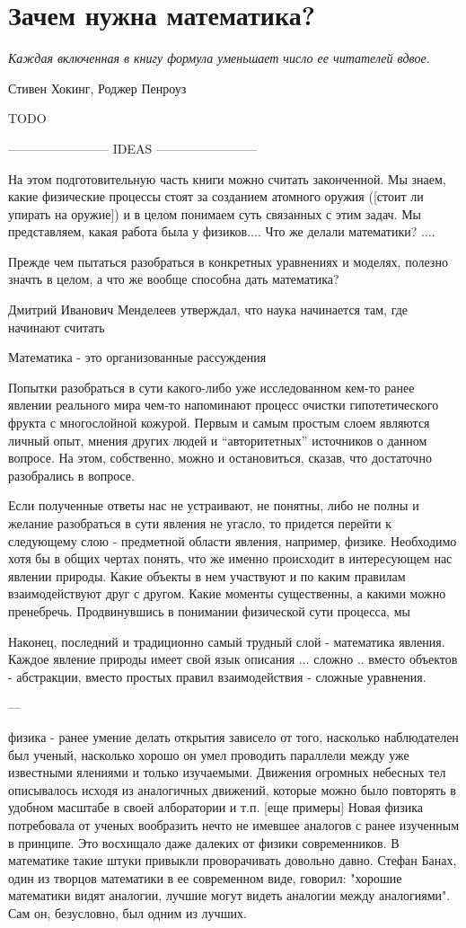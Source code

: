 \chapter{Зачем нужна математика?}\label{ch:why_math}

\epigraph{\emph{Каждая включенная в книгу формула \break уменьшает число ее читателей вдвое.}}{Стивен Хокинг, Роджер Пенроуз}

TODO

------------------------ IDEAS ------------------------ 

На этом подготовительную часть книги можно считать законченной.
Мы знаем, какие физические процессы стоят за созданием атомного оружия ([стоит ли упирать на оружие]) и в целом понимаем суть связанных с этим задач.
Мы представляем, какая работа была у физиков....
Что же делали математики? ....


Прежде чем пытаться разобраться в конкретных уравнениях и моделях, полезно значть в целом, а что же вообще способна дать математика?


Дмитрий Иванович Менделеев утверждал, что наука начинается там, где начинают считать

Математика - это организованные рассуждения


Попытки разобраться в сути какого-либо уже исследованном кем-то ранее явлении реального мира чем-то напоминают процесс очистки гипотетического фрукта с многослойной кожурой.
Первым и самым простым слоем являются личный опыт, мнения других людей и ``авторитетных'' источников о данном вопросе. 
На этом, собственно, можно и остановиться, сказав, что достаточно разобрались в вопросе.

Если полученные ответы нас не устраивают, не понятны, либо не полны и желание разобраться в сути явления не угасло, то придется перейти к следующему слою - предметной области явления, например, физике.
Необходимо хотя бы в общих чертах понять, что же именно происходит в интересующем нас явлении природы. 
Какие объекты в нем участвуют и по каким правилам взаимодействуют друг с другом. Какие моменты существенны, а какими можно пренебречь.
Продвинувшись в понимании физической сути процесса, мы 

Наконец, последний и традиционно самый трудный слой - математика явления.
Каждое явление природы имеет свой язык описания  ...  сложно .. вместо объектов - абстракции, вместо простых правил взаимодействия - сложные уравнения.

---

физика - ранее умение делать открытия зависело от того, насколько наблюдателен был ученый, насколько хорошо он умел проводить параллели между уже известными ялениями и только изучаемыми.
Движения огромных небесных тел описывалось исходя из аналогичных движений, которые можно было повторять в удобном масштабе в своей алборатории и т.п. [еще примеры]
Новая физика потребовала от ученых вообразить нечто не имевшее аналогов с ранее изученным в принципе. 
Это восхищало даже далеких от физики современников.
В математике такие штуки привыкли проворачивать довольно давно. 
Стефан Банах, один из творцов математики в ее современном виде, говорил: "хорошие математики видят аналогии, лучшие могут видеть аналогии между аналогиями". Сам он, безусловно, был одним из лучших.

